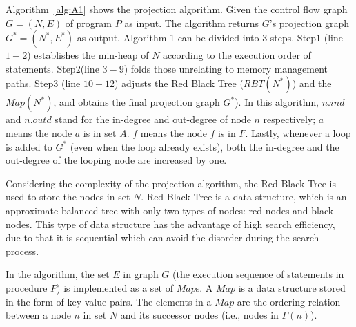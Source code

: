 Algorithm~\ref{alg:A1} shows the projection algorithm. %
%
Given the control flow graph $G = (N, E)$ of program $P$ as input. The algorithm returns $G$'s projection graph $G^*= (N^*, E^*)$ as output. Algorithm 1 can be divided into $3$ steps. Step$1$ (line $1-2$) establishes the min-heap of $N$ according to the execution order of statements. Step$2$(line $3-9$) folds those unrelating to memory management paths. Step$3$ (line $10-12$) adjusts the Red Black Tree ($\mathit{RBT}(N^*)$) and the $\mathit{Map}(N^*)$, and obtains the final projection graph $G^*$).
In this algorithm, $n.ind$ and $n.outd$ stand for the in-degree and out-degree of node $n$ respectively; $a$ means the node $a$ is in set $A$. $f$ means the node $f$ is in $F$. Lastly, whenever a loop is added to $G^*$ (even when the loop already exists), both the in-degree and the out-degree of the looping node are increased by one.

Considering the complexity of the projection algorithm, the Red Black Tree is used to store the nodes in set $N$. Red Black Tree is a data structure, which is an approximate balanced tree with only two types of nodes: red nodes and black nodes. This type of data structure has the advantage of high search efficiency, due to that it is sequential which can avoid the disorder during the search process. 

In the algorithm, the set $E$ in graph $G$ (the execution sequence of statements in procedure $P$) is implemented as a set of $Map$s. A $Map$ is a data structure stored in the form of key-value pairs. The elements in a $Map$ are the ordering relation between a node $n$ in set $N$ and its successor nodes (i.e., nodes in $\Gamma(n)$).

